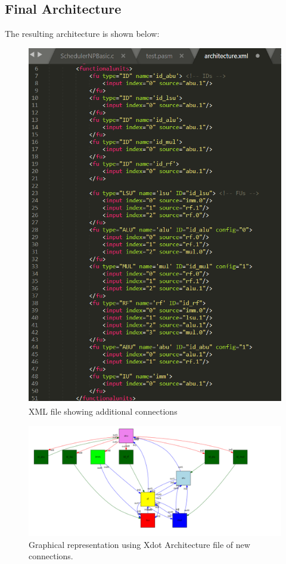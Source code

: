 \documentclass[letterpaper, 10 pt, conference]{ieeeconf}  %
\begin{document}
\subsection{Final Architecture}
\label{imp:E}

The resulting architecture is shown below:

\begin{figure}[h!]
\begin{center}
\includegraphics[scale=0.35]{images/arch01.png}
\caption{XML file showing additional connections}
\label{fig:TODO1}
\end{center}
\end{figure}

\begin{figure}[h!]
\begin{center}
\includegraphics[scale=0.27]{images/arch.png}
\caption{Graphical representation using Xdot Architecture file of new connections.}
\label{fig:TODO2}
\end{center}
\end{figure}
\end{document}
